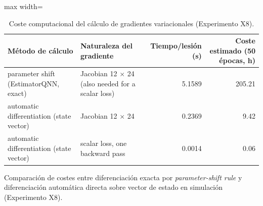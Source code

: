 \begin{table}[H]
\centering
\small
\caption{Coste computacional del cálculo de gradientes variacionales (Experimento X8).}
\label{tab:anexo_x8_gradiente}
\begin{adjustbox}{max width=\linewidth}
\begin{tabular}{l l r r}
\toprule
Método de cálculo & Naturaleza del gradiente & Tiempo/lesión (s) & Coste estimado (50 épocas, h) \\
\midrule
parameter shift (EstimatorQNN, exact) & Jacobian 12 $\times$ 24 (also needed for a scalar loss) & 5.1589 & 205.21 \\
automatic differentiation (state vector) & Jacobian 12 $\times$ 24 & 0.2369 & 9.42 \\
automatic differentiation (state vector) & scalar loss, one backward pass & 0.0014 & 0.06 \\
\bottomrule
\end{tabular}
\end{adjustbox}
\par\smallskip
\parbox{0.95\linewidth}{\footnotesize Comparación de costes entre diferenciación exacta por \textit{parameter-shift rule} y diferenciación automática directa sobre vector de estado en simulación (Experimento X8).}
\end{table}
